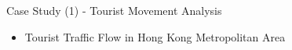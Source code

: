 \documentclass[
 size=14pt,
 paper=smartboard,  %
 mode=present, 		%
 display=slides, 	%
 style=tuliplab,  	%
 pauseslide,
 fleqn,leqno]{powerdot}{}
\begin{document}
\begin{slide}[toc=,bm=]{Case Study (1) - Tourist Movement Analysis}

\begin{itemize}
  \item Tourist Traffic Flow in Hong Kong Metropolitan Area
\end{itemize}

\begin{figure}[htbp]
\end{figure}



\end{slide}
\end{document}
